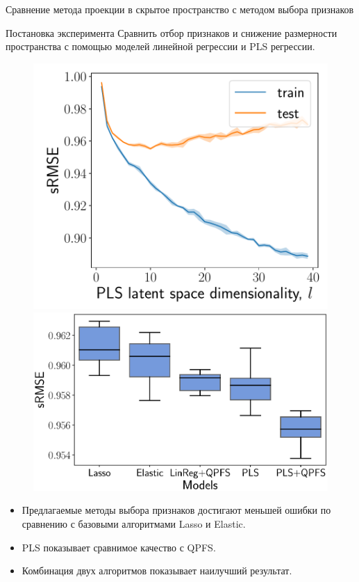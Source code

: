 \documentclass[9pt]{beamer}
\begin{document}
\begin{frame}{Сравнение метода проекции в скрытое пространство с методом выбора признаков}

\begin{block}{Постановка эксперимента}
	 	Сравнить отбор признаков и снижение размерности пространства с помощью моделей линейной регрессии и PLS регрессии.
\end{block}

\begin{figure}[h]
	\begin{minipage}{.43\linewidth}
		\centering
		\includegraphics[width=1.\linewidth]{figs/pls_vs_k}
	\end{minipage}%
	\begin{minipage}{.57\linewidth}
		\centering
		\includegraphics[width=1.\linewidth]{figs/models2}
	\end{minipage}
\end{figure}
\begin{itemize}
	\item Предлагаемые методы выбора признаков достигают меньшей ошибки по сравнению с базовыми алгоритмами Lasso и Elastic.
	\item PLS показывает сравнимое качество с QPFS.
	\item Комбинация двух алгоритмов показывает наилучший результат.
\end{itemize}

\end{frame}
\end{document}
